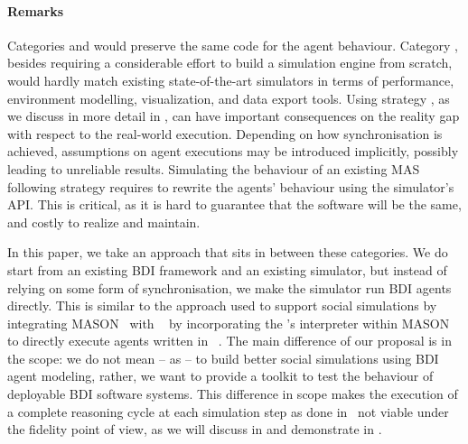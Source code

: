 \paragraph{Remarks}

Categories \relatedExtendFramework{} and \relatedMiddleware{} would preserve the same code for the agent behaviour.
%
Category \relatedExtendFramework{},
besides requiring a considerable effort to build a simulation engine from scratch,
would hardly match existing state-of-the-art simulators
in terms of performance,
environment modelling,
visualization,
and data export tools.
%
Using strategy \relatedMiddleware{}, as we discuss in more detail in ,
can have important consequences on the reality gap with respect to the real-world execution.
%
Depending on how synchronisation is achieved,
assumptions on agent executions may be introduced implicitly,
possibly leading to unreliable results.
%
Simulating the behaviour of an existing \ac{MAS} following strategy \relatedExtendSimulator{}
requires to rewrite the agents' behaviour using the simulator's \ac{API}.
%
This is critical,
as it is hard to guarantee that the software will be the same,
and costly to realize and maintain.

In this paper,
we take an approach that sits in between these categories.
%
We do start from an existing \ac{BDI} framework and an existing simulator,
but instead of relying on some form of synchronisation,
we make the simulator run \ac{BDI} agents directly.
%
This is similar to the approach used to
support social simulations by integrating MASON~\cite{LukeCPSB05} with \jason{}~\cite{BordiniHW2007}
by incorporating the \jason{}'s interpreter within MASON
to directly execute agents written in \agentspeak{}~\cite{caballero2011eaai}.
%
%
The main difference of our proposal is in the scope:
we do not mean -- as \cite{caballero2011eaai} -- to build better social simulations using \ac{BDI} agent modeling,
rather,
 we want to provide a toolkit to test the behaviour of deployable \ac{BDI} software systems.
%
This difference in scope makes the execution of a complete reasoning cycle at each simulation step as done in~\cite{caballero2011eaai}
not viable under the fidelity point of view,
as we will discuss in  and demonstrate in .

